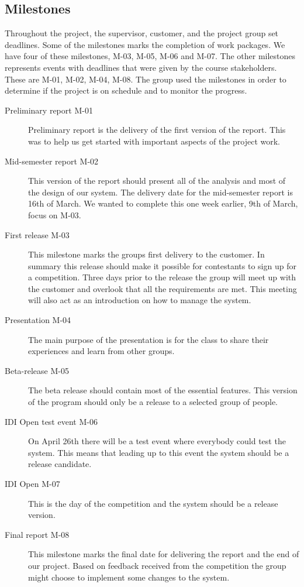 \subsection{Milestones}
Throughout the project, the supervisor, customer, and the project group set
deadlines. Some of the milestones marks the completion of work packages. We
have four of these milestones, M-03, M-05, M-06 and M-07. The other milestones
represents events with deadlines that were given by the course stakeholders.
These are M-01, M-02, M-04, M-08. The group used the milestones in order
to determine if the project is on schedule and to monitor the progress.

\begin{description}
    \item[Preliminary report M-01]
    Preliminary report is the delivery of the first version of the report.
    This was to help us get started with important aspects of the project work.

    \item[Mid-semester report M-02]
    This version of the report should present all of the analysis and most of
    the design of our system. The delivery date for the mid-semester report
    is 16th of March. We wanted to complete this one week earlier, 9th of March,
    focus on M-03.

    \item[First release M-03]
    This milestone marks the groups first delivery to the customer. In summary
    this release should make it possible for contestants to sign up for a
    competition. Three days prior to the release the group will meet up with
    the customer and overlook that all the requirements are met. This meeting
    will also act as an introduction on how to manage the system.

    \item[Presentation M-04]
    The main purpose of the presentation is for the class to share their
    experiences and learn from other groups. 

    \item[Beta-release M-05]
    The beta release should contain most of the essential features.  This
    version of the program should only be a release to a selected group of
    people. 

    \item[IDI Open test event M-06]
    On April 26th there will be a test event where everybody could test the
    system. This means that leading up to this event the system should be a
    release candidate. 

    \item[IDI Open M-07]
    This is the day of the competition and the system should be a release
    version. 

    \item[Final report M-08]
    This milestone marks the final date for delivering the report and the end
    of our project. Based on feedback received from the competition the group
    might choose to implement some changes to the system. 
\end{description}

